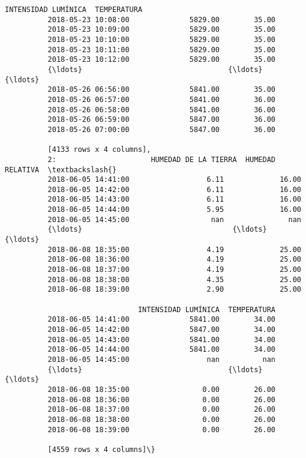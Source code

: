 \documentclass[11pt]{article}
\begin{document}
\begin{Verbatim}[commandchars=\\\{\}]
                               INTENSIDAD LUMÍNICA  TEMPERATURA  
          2018-05-23 10:08:00              5829.00        35.00  
          2018-05-23 10:09:00              5829.00        35.00  
          2018-05-23 10:10:00              5829.00        35.00  
          2018-05-23 10:11:00              5829.00        35.00  
          2018-05-23 10:12:00              5829.00        35.00  
          {\ldots}                                  {\ldots}          {\ldots}  
          2018-05-26 06:56:00              5841.00        35.00  
          2018-05-26 06:57:00              5841.00        36.00  
          2018-05-26 06:58:00              5841.00        36.00  
          2018-05-26 06:59:00              5847.00        36.00  
          2018-05-26 07:00:00              5847.00        36.00  
          
          [4133 rows x 4 columns],
          2:                      HUMEDAD DE LA TIERRA  HUMEDAD RELATIVA  \textbackslash{}
          2018-06-05 14:41:00                  6.11             16.00   
          2018-06-05 14:42:00                  6.11             16.00   
          2018-06-05 14:43:00                  6.11             16.00   
          2018-06-05 14:44:00                  5.95             16.00   
          2018-06-05 14:45:00                   nan               nan   
          {\ldots}                                   {\ldots}               {\ldots}   
          2018-06-08 18:35:00                  4.19             25.00   
          2018-06-08 18:36:00                  4.19             25.00   
          2018-06-08 18:37:00                  4.19             25.00   
          2018-06-08 18:38:00                  4.35             25.00   
          2018-06-08 18:39:00                  2.90             25.00   
          
                               INTENSIDAD LUMÍNICA  TEMPERATURA  
          2018-06-05 14:41:00              5841.00        34.00  
          2018-06-05 14:42:00              5847.00        34.00  
          2018-06-05 14:43:00              5841.00        34.00  
          2018-06-05 14:44:00              5841.00        34.00  
          2018-06-05 14:45:00                  nan          nan  
          {\ldots}                                  {\ldots}          {\ldots}  
          2018-06-08 18:35:00                 0.00        26.00  
          2018-06-08 18:36:00                 0.00        26.00  
          2018-06-08 18:37:00                 0.00        26.00  
          2018-06-08 18:38:00                 0.00        26.00  
          2018-06-08 18:39:00                 0.00        26.00  
          
          [4559 rows x 4 columns]\}
\end{Verbatim}
            
\end{document}
